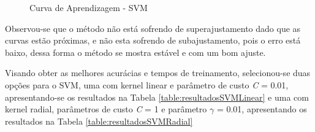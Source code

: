 \begin{figure}[h]
	\centering
{}
\caption{Curva de Aprendizagem - SVM}
\label{fig:SVM}
\end{figure}

Observou-se que o método não está sofrendo de superajustamento dado que as curvas estão próximas, e não esta sofrendo de subajustamento, pois o erro está baixo, dessa forma o método se mostra estável e com um bom ajuste. 

Visando obter as melhores acurácias e tempos de treinamento, selecionou-se duas opções para o SVM, uma com kernel linear e parâmetro de custo \emph{C} = 0.01, apresentando-se os resultados na Tabela \ref{table:resultadosSVMLinear} e uma com kernel radial, parâmetros de custo \emph{C} = 1 e parâmetro \(\gamma\) = 0.01, apresentando os resultados na Tabela \ref{table:resultadosSVMRadial}


